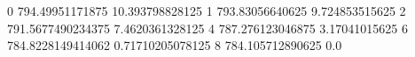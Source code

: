 0 794.49951171875 10.393798828125
1 793.83056640625 9.724853515625
2 791.5677490234375 7.4620361328125
4 787.276123046875 3.17041015625
6 784.8228149414062 0.71710205078125
8 784.105712890625 0.0
